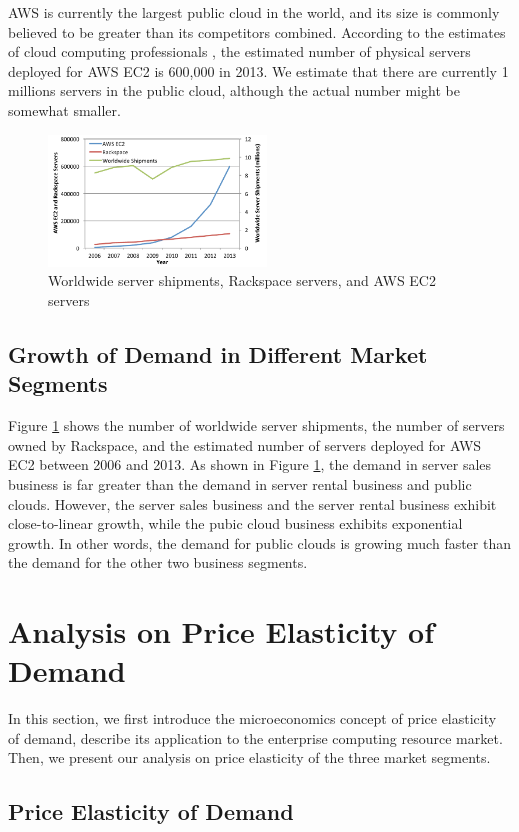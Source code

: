 \documentclass[10pt,journal,cspaper,compsoc]{IEEEtran}
\begin{document}
AWS is currently the largest public cloud in the world, and its size is commonly believed to be greater than its competitors combined. According to the estimates of cloud computing professionals \cite{liu}, the estimated number of physical servers deployed for AWS EC2 is 600,000 in 2013. We estimate that there are currently 1 millions servers in the public cloud, although the actual number might be somewhat smaller. 

\begin{figure}[t!]
\centering
\includegraphics[height=3.5cm]{fig01}
\caption{Worldwide server shipments, Rackspace servers, and AWS EC2 servers}
\label{fig:servershipments}
\end{figure}

\subsection{Growth of Demand in Different Market Segments}
Figure \ref{fig:servershipments} shows the number of worldwide server shipments, the number of servers owned by Rackspace, and the estimated number of servers deployed for AWS EC2 between 2006 and 2013. As shown in Figure \ref{fig:servershipments}, the demand in server sales business is far greater than the demand in server rental business and public clouds. However, the server sales business and the server rental business exhibit close-to-linear growth, while the pubic cloud business exhibits exponential growth. In other words, the demand for public clouds is growing much faster than the demand for the other two business segments. 

\section{Analysis on Price Elasticity of Demand}
\label{sec:analysis}
In this section, we first introduce the microeconomics concept of price elasticity of demand, describe its application to the enterprise computing resource market. Then, we present our analysis on price elasticity of the three market segments.

\subsection{Price Elasticity of Demand}
\end{document}
